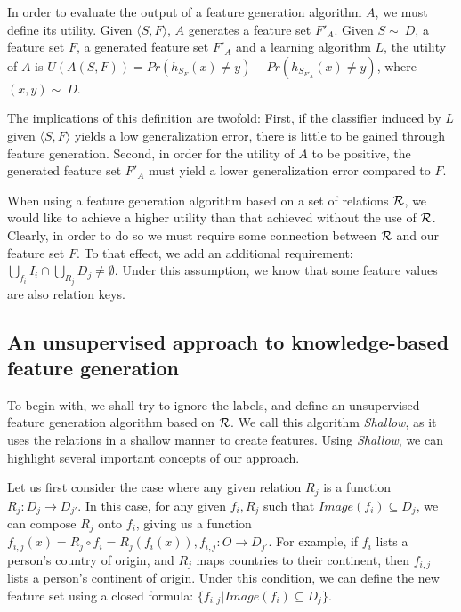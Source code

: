 \documentclass[twoside,11pt]{article}
\theoremstyle{definition}
\begin{document}
In order to evaluate the output of a feature generation algorithm $A$, we must define its utility. Given $\langle S,F \rangle$, $A$ generates a feature set $F'_A$.
Given $S\sim\ D$, a feature set $F$, a generated feature set $F'_A$ and a learning algorithm $L$, the utility of $A$ is $U(A(S,F))=Pr(h_{S_F}(x)\neq y)-Pr(h_{S_{F'_A}}(x)\neq y)$, where $(x,y)\sim\ D$.

The implications of this definition are twofold: First, if the classifier induced by $L$ given  $\langle S,F \rangle$ yields a low generalization error, there is little to be gained through feature generation. Second, in order for the utility of $A$ to be positive, the generated feature set $F'_A$ must yield a lower generalization error compared to $F$.

When using a feature generation algorithm based on a set of relations ${\cal R}$, we would like to achieve a higher utility than that achieved without the use of ${\cal R}$. Clearly, in order to do so we must require some connection between ${\cal R}$ and our feature set $F$. To that effect, we add an additional requirement:  $\bigcup_{f_i} I_i \cap \bigcup_{R_j} D_j \neq \emptyset$. Under this assumption, we know that some feature values are also relation keys.

\subsection{An unsupervised approach to knowledge-based feature generation} \label{shallow_section}

To begin with, we shall try to ignore the labels, and define an unsupervised feature generation algorithm based on ${\cal R}$. We call this algorithm \emph{Shallow}, as it uses the relations in a shallow manner to create features. Using \emph{Shallow}, we can highlight several important concepts of our approach.

Let us first consider the case where any given relation $R_j$ is a function $R_j:D_j\rightarrow D_{j'}$. In this case, for any given $f_i,R_j$ such that 
$Image(f_i) \subseteq D_j$, we can compose $R_j$ onto $f_i$, giving us a function $f_{i,j}(x)=R_j\circ f_i=R_j(f_i(x)),f_{i,j}:O\rightarrow D_{j'}$. For example, if $f_i$ lists a person's country of origin, and $R_j$ maps countries to their continent, then $f_{i,j}$ lists a person's continent of origin.
Under this condition, we can define the new feature set using a closed formula: $\{f_{i,j}|Image(f_i) \subseteq D_j\}$.
\end{document}
